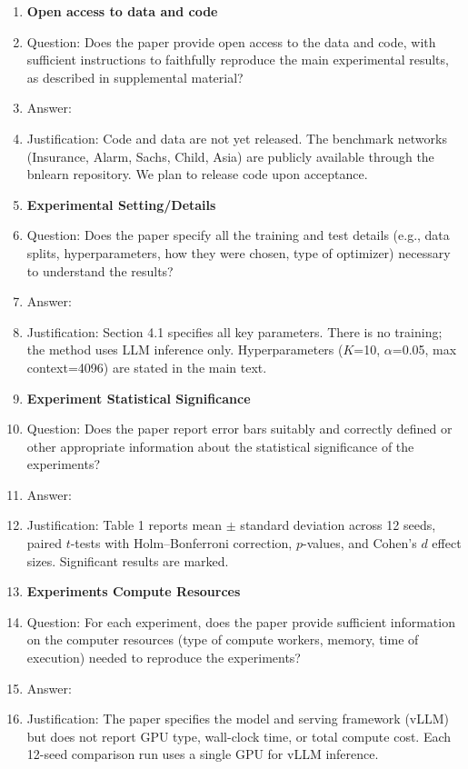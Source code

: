 \begin{enumerate}
\item {\bf Open access to data and code}
    \item[] Question: Does the paper provide open access to the data and code, with sufficient instructions to faithfully reproduce the main experimental results, as described in supplemental material?
    \item[] Answer: \answerNo{}
    \item[] Justification: Code and data are not yet released. The benchmark networks (Insurance, Alarm, Sachs, Child, Asia) are publicly available through the bnlearn repository. We plan to release code upon acceptance.

\item {\bf Experimental Setting/Details}
    \item[] Question: Does the paper specify all the training and test details (e.g., data splits, hyperparameters, how they were chosen, type of optimizer) necessary to understand the results?
    \item[] Answer: \answerYes{}
    \item[] Justification: Section 4.1 specifies all key parameters. There is no training; the method uses LLM inference only. Hyperparameters ($K$=10, $\alpha$=0.05, max context=4096) are stated in the main text.

\item {\bf Experiment Statistical Significance}
    \item[] Question: Does the paper report error bars suitably and correctly defined or other appropriate information about the statistical significance of the experiments?
    \item[] Answer: \answerYes{}
    \item[] Justification: Table 1 reports mean $\pm$ standard deviation across 12 seeds, paired $t$-tests with Holm--Bonferroni correction, $p$-values, and Cohen's $d$ effect sizes. Significant results are marked.

\item {\bf Experiments Compute Resources}
    \item[] Question: For each experiment, does the paper provide sufficient information on the computer resources (type of compute workers, memory, time of execution) needed to reproduce the experiments?
    \item[] Answer: \answerNo{}
    \item[] Justification: The paper specifies the model and serving framework (vLLM) but does not report GPU type, wall-clock time, or total compute cost. Each 12-seed comparison run uses a single GPU for vLLM inference.


\end{enumerate}
